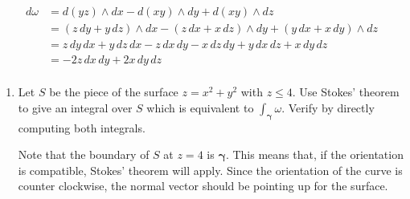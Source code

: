 \documentclass{article}
\begin{document}
\begin{enumerate}
        \begin{align*}
            d\omega &= d(yz) \wedge dx - d(xy) \wedge dy + d(xy) \wedge dz \\
            &= (z \,dy + y\, dz)\wedge dx - (z \, dx + x \, dz) \wedge dy + 
            (y \, dx + x \, dy) \wedge dz \\
            &= z \,dy \, dx + y\, dz \, dx - z \, dx \, dy - x \, dz \, dy + 
            y \, dx \, dz + x \, dy \, dz \\
            &= -2z \,dx \, dy  + 2x \, dy \, dz \\
        \end{align*} 
    \begin{enumerate}
        \item Let $S$ be the piece of the surface $z = x^2 + y^2$ with 
            $z \leq 4$. Use Stokes' theorem to give an integral over $S$ 
            which is equivalent to $\displaystyle \int_{\boldsymbol \gamma} 
            \omega$. Verify by directly computing both integrals.

            Note that the boundary of $S$ at $z = 4$ is $\boldsymbol \gamma$.
            This means that, if the orientation is compatible, Stokes' theorem 
            will apply. Since the orientation of the curve is counter 
            clockwise, the normal vector should be pointing up for the surface.
            

\end{enumerate}
\end{enumerate}
\end{document}
